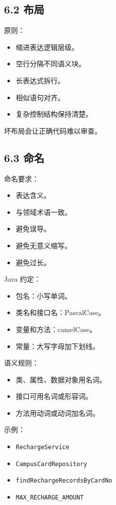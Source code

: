 \documentclass[UTF8,zihao=-4]{ctexart}
\begin{document}
\subsection{6.2 布局}

原则：

\begin{itemize}
\item 缩进表达逻辑层级。
\item 空行分隔不同语义块。
\item 长表达式拆行。
\item 相似语句对齐。
\item 复杂控制结构保持清楚。
\end{itemize}

坏布局会让正确代码难以审查。

\subsection{6.3 命名}

命名要求：

\begin{itemize}
\item 表达含义。
\item 与领域术语一致。
\item 避免误导。
\item 避免无意义缩写。
\item 避免过长。
\end{itemize}

Java 约定：

\begin{itemize}
\item 包名：小写单词。
\item 类名和接口名：PascalCase。
\item 变量和方法：camelCase。
\item 常量：大写字母加下划线。
\end{itemize}

语义规则：

\begin{itemize}
\item 类、属性、数据对象用名词。
\item 接口可用名词或形容词。
\item 方法用动词或动词加名词。
\end{itemize}

示例：

\begin{itemize}
\item \texttt{RechargeService}
\item \texttt{CampusCardRepository}
\item \texttt{findRechargeRecordsByCardNo}
\item \texttt{MAX\_RECHARGE\_AMOUNT}
\end{itemize}
\end{document}
